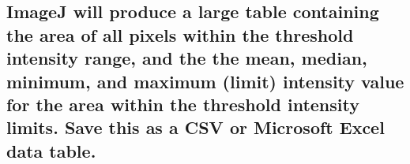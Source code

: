 \documentclass[11pt]{article}
\begin{document}
\subsection{{\bfseries\sffamily } ImageJ will produce a large table containing the area of all pixels within the threshold intensity range, and the the mean, median, minimum, and maximum (limit) intensity value for the area within the threshold intensity limits. Save this as a CSV or Microsoft Excel data table.}
\label{sec:orgheadline72}
\end{document}
